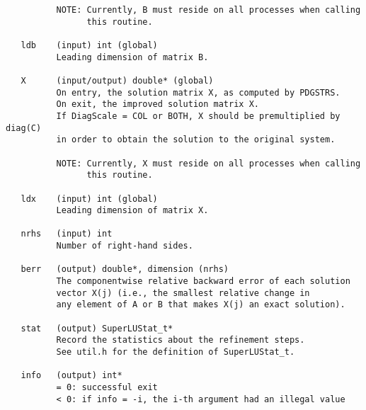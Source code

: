 \begin{verbatim}
          NOTE: Currently, B must reside on all processes when calling
                this routine.
  
   ldb    (input) int (global)
          Leading dimension of matrix B.
  
   X      (input/output) double* (global)
          On entry, the solution matrix X, as computed by PDGSTRS.
          On exit, the improved solution matrix X.
          If DiagScale = COL or BOTH, X should be premultiplied by diag(C)
          in order to obtain the solution to the original system.
  
          NOTE: Currently, X must reside on all processes when calling
                this routine.
  
   ldx    (input) int (global)
          Leading dimension of matrix X.
  
   nrhs   (input) int
          Number of right-hand sides.
  
   berr   (output) double*, dimension (nrhs)
          The componentwise relative backward error of each solution   
          vector X(j) (i.e., the smallest relative change in   
          any element of A or B that makes X(j) an exact solution).
  
   stat   (output) SuperLUStat_t*
          Record the statistics about the refinement steps.
          See util.h for the definition of SuperLUStat_t.
  
   info   (output) int*
          = 0: successful exit
          < 0: if info = -i, the i-th argument had an illegal value
          
\end{verbatim}
